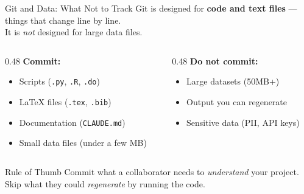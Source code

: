 \documentclass[aspectratio=169, 11pt]{beamer}
\begin{document}
\begin{frame}[fragile]{Git and Data: What Not to Track}
  Git is designed for \textbf{code and text files} --- things that change line by line.\\
  It is \textit{not} designed for large data files.

  \vspace{0.3em}
  \begin{columns}[T]
    \begin{column}{0.48\textwidth}
      \textbf{Commit:}
      \begin{itemize}
        \item Scripts (\texttt{.py}, \texttt{.R}, \texttt{.do})
        \item \LaTeX{} files (\texttt{.tex}, \texttt{.bib})
        \item Documentation (\texttt{CLAUDE.md})
        \item Small data files (under a few MB)
      \end{itemize}
    \end{column}
    \begin{column}{0.48\textwidth}
      \textbf{Do not commit:}
      \begin{itemize}
        \item Large datasets (50MB+)
        \item Output you can regenerate
        \item Sensitive data (PII, API keys)
      \end{itemize}
    \end{column}
  \end{columns}

  \vspace{0.5em}
  \begin{block}{Rule of Thumb}
    Commit what a collaborator needs to \textit{understand} your project. Skip what they could \textit{regenerate} by running the code.
  \end{block}
\end{frame}
\end{document}
